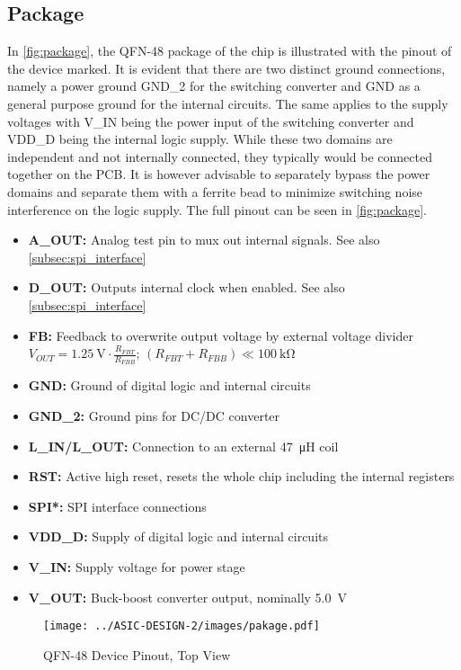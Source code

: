 \subsection{Package}
In \autoref{fig:package}, the QFN-48 package of the chip is illustrated with the pinout of the device marked. It is evident that there are two distinct ground connections, namely a power ground GND\_2 for the switching converter and GND as a general purpose ground for the internal circuits. The same applies to the supply voltages with V\_IN being the power input of the switching converter and VDD\_D being the internal logic supply. While these two domains are independent and not internally connected, they typically would be connected together on the \ac{PCB}. It is however advisable to separately bypass the power domains and separate them with a ferrite bead to minimize switching noise interference on the logic supply. The full pinout can be seen in \autoref{fig:package}.
\begin{itemize}
	\item \textbf{A\_OUT:} Analog test pin to mux out internal signals. See also \autoref{subsec:spi_interface}
	\item \textbf{D\_OUT:} Outputs internal clock when enabled. See also \autoref{subsec:spi_interface}
	\item \textbf{FB:} Feedback to overwrite output voltage by external voltage divider \\
            $V_{OUT} = \qty{1.25}{\volt} \cdot \frac{R_{FBT}}{R_{FBB}}$; $(R_{FBT}+R_{FBB}) \ll \qty{100}{\kilo\ohm}$
	\item \textbf{GND:} Ground of digital logic and internal circuits
	\item \textbf{GND\_2:} Ground pins for DC/DC converter
	\item \textbf{L\_IN/L\_OUT:} Connection to an external \qty{47}{\micro\henry} coil
	\item \textbf{RST:} Active high reset, resets the whole chip including the internal registers
	\item \textbf{SPI*:} SPI interface connections
	\item \textbf{VDD\_D:} Supply of digital logic and internal circuits
	\item \textbf{V\_IN:} Supply voltage for power stage
	\item \textbf{V\_OUT:} Buck-boost converter output, nominally \qty{5.0}{\volt}
\end{itemize}
\begin{figure}[h]
	\centering
	\texttt{[image: ../ASIC-DESIGN-2/images/pakage.pdf]}
	\caption{QFN-48 Device Pinout, Top View}
	\label{fig:package}
\end{figure}
